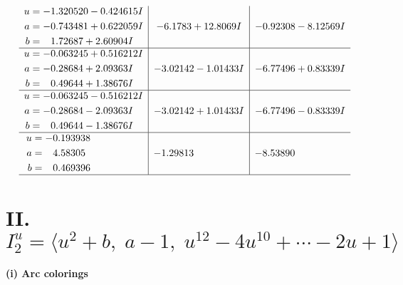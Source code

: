 \documentclass[1p]{elsarticle_modified}
\theoremstyle{definition}
\begin{document}
$$\begin{array}{c|c|c}
\begin{aligned}
u &= -1.320520 - 0.424615 I \\
a &= -0.743481 + 0.622059 I \\
b &= \phantom{-}1.72687 + 2.60904 I\end{aligned}
 & -6.1783 + 12.8069 I & -0.92308 - 8.12569 I \\ \hline\begin{aligned}
u &= -0.063245 + 0.516212 I \\
a &= -0.28684 + 2.09363 I \\
b &= \phantom{-}0.49644 + 1.38676 I\end{aligned}
 & -3.02142 - 1.01433 I & -6.77496 + 0.83339 I \\ \hline\begin{aligned}
u &= -0.063245 - 0.516212 I \\
a &= -0.28684 - 2.09363 I \\
b &= \phantom{-}0.49644 - 1.38676 I\end{aligned}
 & -3.02142 + 1.01433 I & -6.77496 - 0.83339 I \\ \hline\begin{aligned}
u &= -0.193938\phantom{ +0.000000I} \\
a &= \phantom{-}4.58305\phantom{ +0.000000I} \\
b &= \phantom{-}0.469396\phantom{ +0.000000I}\end{aligned}
 & -1.29813\phantom{ +0.000000I} & -8.53890\phantom{ +0.000000I}\\
 \hline 
 \end{array}$$\newpage\newpage\renewcommand{\arraystretch}{1}
\centering \section*{II. $I^u_{2}= \langle u^2+b,\;a-1,\;u^{12}-4 u^{10}+\cdots-2 u+1 \rangle$}
\flushleft \textbf{(i) Arc colorings}\\
\end{document}
